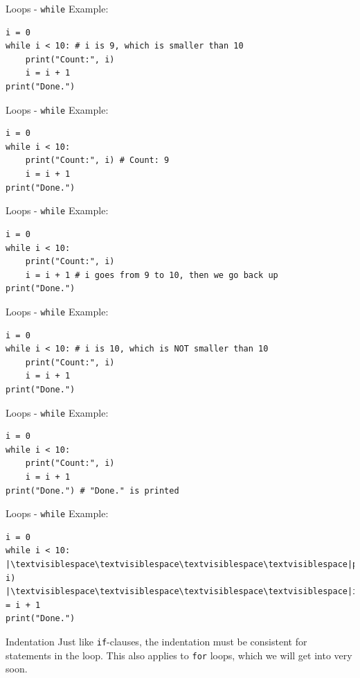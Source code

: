 \documentclass[dvipsnames, svgnames, x11names, handout]{beamer}
\begin{document}
\addtocounter{framenumber}{-1}

\begin{frame}[fragile]{Loops - \texttt{while}}
Example:
\begin{verbatim}
i = 0
while i < 10: # i is 9, which is smaller than 10
    print("Count:", i)
    i = i + 1
print("Done.")
\end{verbatim}
\end{frame}

\addtocounter{framenumber}{-1}

\begin{frame}[fragile]{Loops - \texttt{while}}
Example:
\begin{verbatim}
i = 0
while i < 10: 
    print("Count:", i) # Count: 9
    i = i + 1
print("Done.")
\end{verbatim}
\end{frame}

\addtocounter{framenumber}{-1}

\begin{frame}[fragile]{Loops - \texttt{while}}
Example:
\begin{verbatim}
i = 0
while i < 10: 
    print("Count:", i)
    i = i + 1 # i goes from 9 to 10, then we go back up
print("Done.")
\end{verbatim}
\end{frame}

\addtocounter{framenumber}{-1}

\begin{frame}[fragile]{Loops - \texttt{while}}
Example:
\begin{verbatim}
i = 0
while i < 10: # i is 10, which is NOT smaller than 10
    print("Count:", i)
    i = i + 1
print("Done.")
\end{verbatim}
\end{frame}

\addtocounter{framenumber}{-1}

\begin{frame}[fragile]{Loops - \texttt{while}}
Example:
\begin{verbatim}
i = 0
while i < 10:
    print("Count:", i)
    i = i + 1
print("Done.") # "Done." is printed
\end{verbatim}
\end{frame}

\begin{frame}[fragile]{Loops - \texttt{while}}
Example:
\begin{verbatim}
i = 0
while i < 10:
|\textvisiblespace\textvisiblespace\textvisiblespace\textvisiblespace|print("Count:", i)
|\textvisiblespace\textvisiblespace\textvisiblespace\textvisiblespace|i = i + 1
print("Done.")
\end{verbatim}
\begin{block}{Indentation}
Just like \texttt{if}-clauses, the indentation must be consistent for statements in the loop.
This also applies to \texttt{for} loops, which we will get into very soon.
\end{block}
\end{frame}
\end{document}
